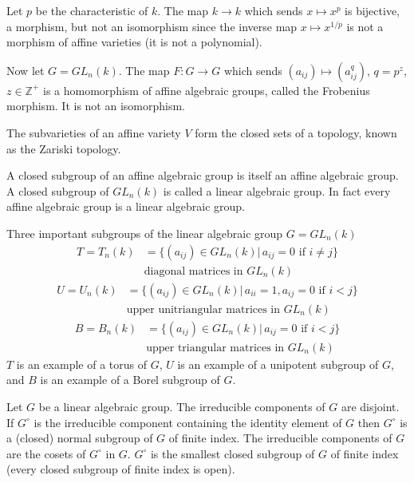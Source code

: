 \begin{example}
	Let $p$ be the characteristic of $k$. The map $k\rightarrow k$ which sends $x\mapsto x^p$ is bijective, a morphism, but not an isomorphism since the inverse map $x\mapsto x^{1/p}$ is not a morphism of affine varieties (it is not a polynomial).
	
	Now let $G = GL_n(k)$. The map $F:G\rightarrow G$ which sends $(a_{ij})\mapsto (a_{ij}^q)$, $q = p^z$, $z \in \mathbb{Z}^+$ is a homomorphism of affine algebraic groups, called the Frobenius morphism. It is not an isomorphism.
\end{example}

The subvarieties of an affine variety $V$ form the closed sets of a topology, known as the Zariski topology.

A closed subgroup of an affine algebraic group is itself an affine algebraic group. A closed subgroup of $GL_n(k)$ is called a linear algebraic group. In fact every affine algebraic group is a linear algebraic group.

\begin{example}
	Three important subgroups of the linear algebraic group $G = GL_n(k)$
	\begin{align*}
		T = T_n(k) &=  \{ (a_{ij}) \in GL_n(k) |\, a_{ij} = 0 \textrm{ if } i \neq j\}\\
		&  \textrm{diagonal matrices in } GL_n(k)
	\end{align*}
	\begin{align*}
		U = U_n(k) &=  \{ (a_{ij}) \in GL_n(k) |\, a_{ii} = 1, a_{ij} = 0 \textrm{ if } i < j\}\\
		&  \textrm{upper unitriangular matrices in } GL_n(k)
	\end{align*}
	\begin{align*}
		B = B_n(k) &=  \{ (a_{ij}) \in GL_n(k) |\, a_{ij} = 0 \textrm{ if } i < j\}\\
		&  \textrm{upper triangular matrices in } GL_n(k)
	\end{align*}
	$T$ is an example of a torus of $G$, $U$ is an example of a unipotent subgroup of $G$, and $B$ is an example of a Borel subgroup of $G$.
\end{example}

Let $G$ be a linear algebraic group. The irreducible components of $G$ are disjoint. If $G^\circ$ is the irreducible component containing the identity element of $G$ then $G^\circ$ is a (closed) normal subgroup of $G$ of finite index. The irreducible components of $G$ are the cosets of $G^\circ$ in $G$. $G^\circ$ is the smallest closed subgroup of $G$ of finite index (every closed subgroup of finite index is open).

